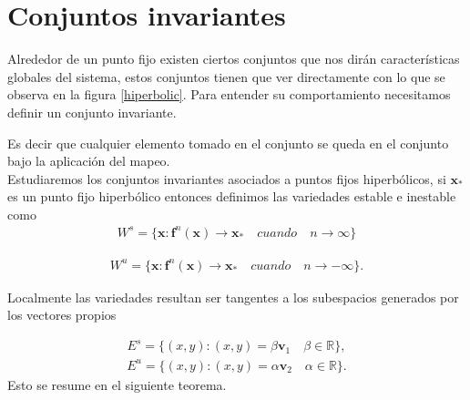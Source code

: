 \section{Conjuntos invariantes}
Alrededor de un punto fijo existen ciertos conjuntos que nos dirán características globales del sistema, estos conjuntos tienen que ver directamente con lo que se observa en la figura \ref{hiperbolic}. Para entender su comportamiento necesitamos definir un conjunto invariante.

Es decir que cualquier elemento tomado en el conjunto se queda en el conjunto bajo la aplicación del mapeo. \\
Estudiaremos los conjuntos invariantes asociados a puntos fijos hiperbólicos, si $\mathbf{x}_{*}$ es un punto fijo hiperbólico entonces definimos las variedades estable e inestable como
\begin{eqnarray}
W^{s}=\lbrace \mathbf{x} : \mathbf{f}^{n}(\mathbf{x})\rightarrow \mathbf{x}_{*} \quad cuando \quad n\rightarrow \infty \rbrace
\label{variedad estable}
\end{eqnarray}

\begin{eqnarray}
W^{u}=\lbrace \mathbf{x} : \mathbf{f}^{n}(\mathbf{x})\rightarrow \mathbf{x}_{*} \quad cuando \quad n\rightarrow -\infty \rbrace.
\label{variedad inestable}
\end{eqnarray}


Localmente las variedades resultan ser tangentes a los subespacios generados por los vectores propios

\begin{eqnarray*}
E^{s}=\lbrace (x,y) : (x,y)=\beta \pmb v_{1} \quad \beta\in \mathbb{R}\rbrace,
\end{eqnarray*}
\begin{eqnarray*}
E^{u}=\lbrace (x,y) : (x,y)=\alpha \pmb v_{2}\quad \alpha\in \mathbb{R}\rbrace .
\end{eqnarray*}
Esto se resume en el siguiente teorema.


